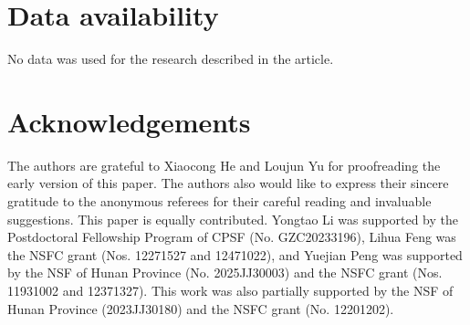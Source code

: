 \documentclass[11pt]{article}
\begin{document}
\section*{Data availability}
No data was used for the research described in the article.
\fi 


\section*{Acknowledgements} 
The authors  are grateful to Xiaocong He and Loujun Yu for proofreading the early version of this paper. The authors also would like to express their sincere gratitude to the anonymous referees for their careful reading and invaluable suggestions. 
This paper is equally contributed. 
Yongtao Li was supported by the Postdoctoral Fellowship Program of CPSF (No. GZC20233196), 
 Lihua Feng was  the NSFC grant (Nos. 12271527 and 12471022), 
 and Yuejian Peng was supported by the NSF of Hunan Province (No. 2025JJ30003) and 
the NSFC grant (Nos. 11931002 and 12371327).  
This work was also partially supported by the NSF of Hunan Province  (2023JJ30180) and  the NSFC grant (No. 12201202). 
\end{document}
